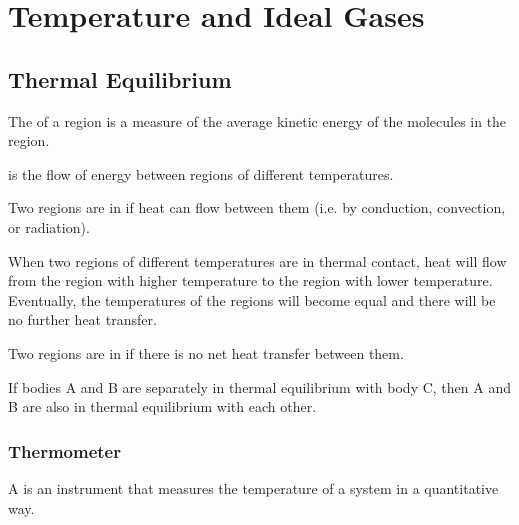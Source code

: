 \chapter{Temperature and Ideal Gases}

\section{Thermal Equilibrium}

\begin{definition}
    The  of a region is a measure of the average kinetic energy of the molecules in the region.
\end{definition}

\begin{definition}
     is the flow of energy between regions of different temperatures.
\end{definition}

\begin{definition}
    Two regions are in  if heat can flow between them (i.e. by conduction, convection, or radiation).
\end{definition}

When two regions of different temperatures are in thermal contact, heat will flow from the region with higher temperature to the region with lower temperature. Eventually, the temperatures of the regions will become equal and there will be no further heat transfer.

\begin{definition}
    Two regions are in  if there is no net heat transfer between them.
\end{definition}

\begin{law}
    If bodies A and B are separately in thermal equilibrium with body C, then A and B are also in thermal equilibrium with each other.
\end{law}

\subsection{Thermometer}

\begin{definition}
    A  is an instrument that measures the temperature of a system in a quantitative way.
\end{definition}

